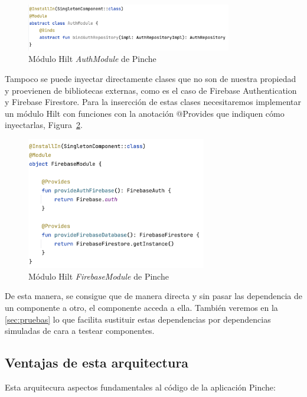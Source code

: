\begin{figure}[H]
\centering
\includegraphics[width=0.8\textwidth]{./img/description/auth_module_hilt.png}
\caption{Módulo Hilt \textit{AuthModule} de Pinche}
\label{fig:authModuleHilt}
\end{figure}

Tampoco se puede inyectar directamente clases que no son de nuestra propiedad y proevienen de bibliotecas externas, como es el caso de Firebase Authentication y Firebase Firestore. Para la insercción de estas clases necesitaremos implementar un módulo Hilt con funciones con la anotación @Provides que indiquen cómo inyectarlas, Figura~\ref{fig:firebaseHilt}.

\begin{figure}[H]
\centering
\includegraphics[width=0.7\textwidth]{./img/description/firebase_hilt.png}
\caption{Módulo Hilt \textit{FirebaseModule} de Pinche}
\label{fig:firebaseHilt}
\end{figure}

De esta manera, se consigue que de manera directa y sin pasar las dependencia de un componente a otro, el componente acceda a ella. También veremos en la \autoref{sec:pruebas} lo que facilita sustituir estas dependencias por dependencias simuladas de cara a testear componentes.

\subsection{Ventajas de esta arquitectura}

Esta arquitecura aspectos fundamentales al código de la aplicación Pinche:

